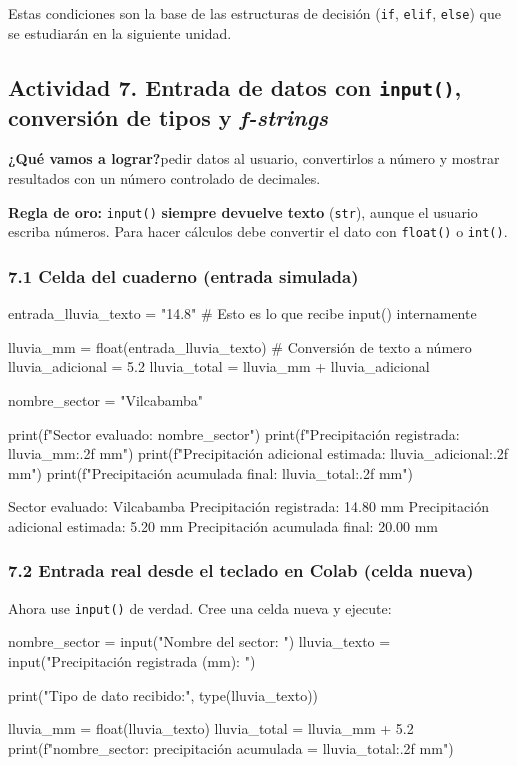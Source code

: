 \documentclass[11pt,a4paper]{article}
\newcommand{\code}[1]{\texttt{#1}}
\newcommand{\actividad}[1]{\begin{objetivo}\textbf{\color{tealProfundo}¿Qué vamos a lograr?}\enspace #1\end{objetivo}}
\begin{document}
Estas condiciones son la base de las estructuras de decisión (\code{if}, \code{elif}, \code{else}) que se estudiarán en la siguiente unidad.

\subsection{Actividad 7. Entrada de datos con \code{input()}, conversión de tipos y \emph{f-strings}}
\actividad{pedir datos al usuario, convertirlos a número y mostrar resultados con un número controlado de decimales.}

\begin{crit}
\textbf{Regla de oro:} \code{input()} \textbf{siempre devuelve texto} (\code{str}), aunque el usuario escriba números. Para hacer cálculos debe convertir el dato con \code{float()} o \code{int()}.
\end{crit}

\subsubsection{7.1 Celda del cuaderno (entrada simulada)}
\begin{codigo}
entrada_lluvia_texto = "14.8"   # Esto es lo que recibe input() internamente

lluvia_mm = float(entrada_lluvia_texto)   # Conversión de texto a número
lluvia_adicional = 5.2
lluvia_total = lluvia_mm + lluvia_adicional

nombre_sector = "Vilcabamba"

print(f"Sector evaluado: {nombre_sector}")
print(f"Precipitación registrada: {lluvia_mm:.2f} mm")
print(f"Precipitación adicional estimada: {lluvia_adicional:.2f} mm")
print(f"Precipitación acumulada final: {lluvia_total:.2f} mm")
\end{codigo}
\begin{salida}
Sector evaluado: Vilcabamba
Precipitación registrada: 14.80 mm
Precipitación adicional estimada: 5.20 mm
Precipitación acumulada final: 20.00 mm
\end{salida}

\subsubsection{7.2 Entrada real desde el teclado en Colab (celda nueva)}
Ahora use \code{input()} de verdad. Cree una celda nueva y ejecute:

\begin{codigo}
nombre_sector = input("Nombre del sector: ")
lluvia_texto = input("Precipitación registrada (mm): ")

print("Tipo de dato recibido:", type(lluvia_texto))

lluvia_mm = float(lluvia_texto)
lluvia_total = lluvia_mm + 5.2
print(f"{nombre_sector}: precipitación acumulada = {lluvia_total:.2f} mm")
\end{codigo}
\end{document}
